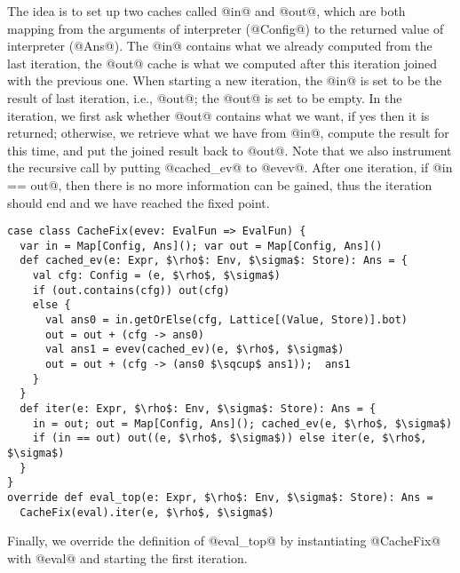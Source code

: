The idea is to set up two caches called @in@ and @out@, which are both mapping from the arguments of interpreter 
(@Config@) to the returned value of interpreter (@Ans@). The @in@ contains what we already computed from the last
iteration, the @out@ cache is what we computed after this iteration joined with the previous one.
When starting a new iteration, the @in@ is set to be the result of last iteration, i.e., @out@; the @out@ is set
to be empty. In the iteration, we first ask whether @out@ contains what we want, if yes then it is returned;
otherwise, we retrieve what we have from @in@, compute the result for this time, and put the joined result back to @out@.
Note that we also instrument the recursive call by putting @cached_ev@ to @evev@.
After one iteration, if @in == out@, then there is no more information can be gained, thus the iteration should 
end and we have reached the fixed point.

\begin{lstlisting}
case class CacheFix(evev: EvalFun => EvalFun) {
  var in = Map[Config, Ans](); var out = Map[Config, Ans]()
  def cached_ev(e: Expr, $\rho$: Env, $\sigma$: Store): Ans = {
    val cfg: Config = (e, $\rho$, $\sigma$)
    if (out.contains(cfg)) out(cfg)
    else {
      val ans0 = in.getOrElse(cfg, Lattice[(Value, Store)].bot)
      out = out + (cfg -> ans0)
      val ans1 = evev(cached_ev)(e, $\rho$, $\sigma$)
      out = out + (cfg -> (ans0 $\sqcup$ ans1));  ans1
    }
  }
  def iter(e: Expr, $\rho$: Env, $\sigma$: Store): Ans = {
    in = out; out = Map[Config, Ans](); cached_ev(e, $\rho$, $\sigma$)
    if (in == out) out((e, $\rho$, $\sigma$)) else iter(e, $\rho$, $\sigma$)
  }
}
override def eval_top(e: Expr, $\rho$: Env, $\sigma$: Store): Ans = 
  CacheFix(eval).iter(e, $\rho$, $\sigma$)
\end{lstlisting}

Finally, we override the definition of @eval_top@ by instantiating @CacheFix@ with @eval@ and starting 
the first iteration.

